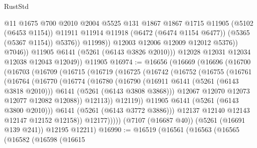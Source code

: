 \begin{lexlean}{RustStd}
\begin{coremodule}
                          @11
                          @1675
                          @700
                          @2010
                          @2004
                          @5525
                          @131
                          @1867
                          @1867
                          @1715
                          @11905
                          (@5102 (@6453 @1154))
                          @11911
                          @11914
                          @11918
                          (@6472 (@6474 @1154 @6477))
                          (@5365 (@5367 @1154))
                          @5376))
                      @11998))
                  @12003
                  @12006
                  @12009
                  @12012
                  @5376))
              @7046))
          @11905
          @6141
          (@5261 (@6143 @3826 @2010)))
        @12028
        @12031
        @12034
        @12038
        @12043
        @12049))
    @11905
@16974 := @16656
    (@16669
      (@16696
        (@16700
          (@16703
            (@16709
              (@16715
                (@16719
                  (@16725
                    (@16742
                      (@16752
                        (@16755
                          (@16761
                            (@16764
                              (@16770
                                (@16774
                                  (@16780
                                    (@16790
                                      (@16911 @6141 (@5261 (@6143 @3818 @2010)))
                                      @6141
                                      (@5261 (@6143 @3808 @3868)))
                                    @12067
                                    @12070
                                    @12073
                                    @12077
                                    @12082
                                    @12088))
                                @12113))
                            @12119))
                        @11905
                        @6141
                        (@5261 (@6143 @3800 @2010)))
                      @6141
                      (@5261 (@6143 @3772 @3886)))
                    @12137
                    @12140
                    @12143
                    @12147
                    @12152
                    @12158))
                @12177)))))
      (@7107 (@16687 @40))
      (@5261 (@16691 @139 @241))
      @12195
      @12211)
@16990 := @16519
    (@16561
      (@16563
        (@16565
          (@16582
            (@16598
              (@16615

\end{coremodule}
\end{lexlean}
